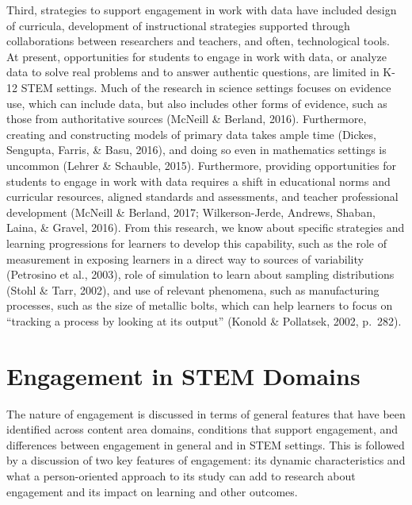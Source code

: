 \documentclass[]{book}
\theoremstyle{definition}
\theoremstyle{definition}
\theoremstyle{definition}
\theoremstyle{remark}
\begin{document}
Third, strategies to support engagement in work with data have included
design of curricula, development of instructional strategies supported
through collaborations between researchers and teachers, and often,
technological tools. At present, opportunities for students to engage in
work with data, or analyze data to solve real problems and to answer
authentic questions, are limited in K-12 STEM settings. Much of the
research in science settings focuses on evidence use, which can include
data, but also includes other forms of evidence, such as those from
authoritative sources (McNeill \& Berland, 2016). Furthermore, creating
and constructing models of primary data takes ample time (Dickes,
Sengupta, Farris, \& Basu, 2016), and doing so even in mathematics
settings is uncommon (Lehrer \& Schauble, 2015). Furthermore, providing
opportunities for students to engage in work with data requires a shift
in educational norms and curricular resources, aligned standards and
assessments, and teacher professional development (McNeill \& Berland,
2017; Wilkerson-Jerde, Andrews, Shaban, Laina, \& Gravel, 2016). From
this research, we know about specific strategies and learning
progressions for learners to develop this capability, such as the role
of measurement in exposing learners in a direct way to sources of
variability (Petrosino et al., 2003), role of simulation to learn about
sampling distributions (Stohl \& Tarr, 2002), and use of relevant
phenomena, such as manufacturing processes, such as the size of metallic
bolts, which can help learners to focus on ``tracking a process by
looking at its output'' (Konold \& Pollatsek, 2002, p.~282).

\section{Engagement in STEM Domains}\label{engagement-in-stem-domains}

The nature of engagement is discussed in terms of general features that
have been identified across content area domains, conditions that
support engagement, and differences between engagement in general and in
STEM settings. This is followed by a discussion of two key features of
engagement: its dynamic characteristics and what a person-oriented
approach to its study can add to research about engagement and its
impact on learning and other outcomes.
\end{document}
